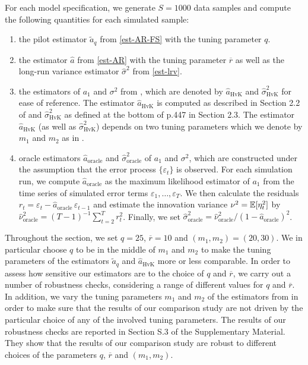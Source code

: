 For each model specification, we generate $S=1000$ data samples and compute the following quantities for each simulated sample: 
\begin{enumerate}[label=(\roman*),leftmargin=0.9cm]
\item the pilot estimator $\widetilde{a}_q$ from \eqref{est-AR-FS} with the tuning parameter $q$.
\item the estimator $\widehat{a}$ from \eqref{est-AR} with the tuning parameter $\overline{r}$ as well as the long-run variance estimator $\widehat{\sigma}^2$ from \eqref{est-lrv}. 
\item the estimators of $a_1$ and $\sigma^2$ from \cite{Hall2003}, which are denoted by $\widehat{a}_{\text{HvK}}$ and $\widehat{\sigma}^2_{\text{HvK}}$ for ease of reference. The estimator $\widehat{a}_{\text{HvK}}$ is computed as described in Section 2.2 of \cite{Hall2003} and $\widehat{\sigma}^2_{\text{HvK}}$ as defined at the bottom of p.447 in Section 2.3. The estimator $\widehat{a}_{\text{HvK}}$ (as well as $\widehat{\sigma}^2_{\text{HvK}}$) depends on two tuning parameters which we denote by $m_1$ and $m_2$ as in \cite{Hall2003}. 
\item oracle estimators $\widehat{a}_{\text{oracle}}$ and $\widehat{\sigma}^2_{\text{oracle}}$ of $a_1$ and $\sigma^2$, which are constructed under the assumption that the error process $\{\varepsilon_t\}$ is observed. For each simulation run, we compute $\widehat{a}_{\text{oracle}}$ as the maximum likelihood estimator of $a_1$ from the time series of simulated error terms $\varepsilon_1,\ldots,\varepsilon_T$. We then calculate the residuals $r_t = \varepsilon_t - \widehat{a}_{\text{oracle}} \, \varepsilon_{t-1}$ and estimate the innovation variance $\nu^2 = \mathbb{E}[\eta_t^2]$ by $\widehat{\nu}_{\text{oracle}}^2 = (T-1)^{-1} \sum_{t=2}^T r_t^2$. Finally, we set $\widehat{\sigma}^2_{\text{oracle}} = \widehat{\nu}_{\text{oracle}}^2 / (1 - \widehat{a}_{\text{oracle}})^2$. 
\end{enumerate}
Throughout the section, we set $q = 25$, $\overline{r} = 10$ and $(m_1,m_2) = (20,30)$. We in particular choose $q$ to be in the middle of $m_1$ and $m_2$ to make the tuning parameters of the estimators $\widetilde{a}_q$ and $\widehat{a}_{\text{HvK}}$ more or less comparable. In order to assess how sensitive our estimators are to the choice of $q$ and $\overline{r}$, we carry out a number of robustness checks, considering a range of different values for $q$ and $\overline{r}$. In addition, we vary the tuning parameters $m_1$ and $m_2$ of the estimators from \cite{Hall2003} in order to make sure that the results of our comparison study are not driven by the particular choice of any of the involved tuning parameters. The results of our robustness checks are reported in Section S.3 of the Supplementary Material. They show that the results of our comparison study are robust to %
different choices of the parameters $q$, $\overline{r}$ and $(m_1,m_2)$. %


